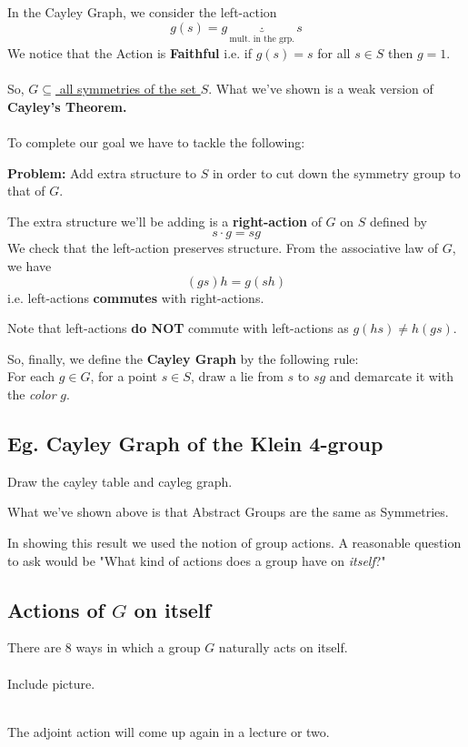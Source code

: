 \documentclass[11pt]{article}
\begin{document}
In the Cayley Graph, we consider the left-action \[ g(s) = g \underbrace{\cdot}_{\text{mult. in the grp.}} s  \] We notice that the Action is \textbf{Faithful} i.e. if $g(s) = s$ for all $s \in S$ then $g = 1$.
\\
\\
So, \underline{$G \subseteq $ all symmetries of the set $S$}. What we've shown is a weak version of \textbf{Cayley's Theorem.}
\\
\\
To complete our goal we have to tackle the following:
\begin{dottedbox}
  \textbf{Problem:} Add extra structure to $S$ in order to cut down the symmetry group to that of $G$.
\end{dottedbox} The extra structure we'll be adding is a \textbf{right-action} of $G$ on $S$ defined by \[ s \cdot g = sg \]
We check that the left-action preserves structure. From the associative law of $G$, we have
\[ (gs)h = g(sh)  \] i.e. left-actions \textbf{commutes} with right-actions.

\begin{redbox}
  Note that left-actions \textbf{do NOT} commute with left-actions as $g(hs) \neq h(gs)$.
\end{redbox} So, finally, we define the \textbf{Cayley Graph} by the following rule:
\\
For each $g \in G$, for a point $s \in S$, draw a lie from $s$ to $sg$ and demarcate it with the \textit{color} $g$.

\subsection*{Eg. Cayley Graph of the Klein 4-group}
Draw the cayley table and cayleg graph. 
\\
\begin{bluebox}
  What we've shown above is that Abstract Groups are the same as Symmetries.
\end{bluebox} In showing this result we used the notion of group actions. A reasonable question to ask would be "What kind of actions does a group have on \textit{itself}?"

\subsection{Actions of $G$ on itself}
There are 8 ways in which a group $G$ naturally acts on itself. 
\\
\\
Include picture.
\\
\\
\begin{remark}
  {The adjoint action will come up again in a lecture or two.}
\end{remark}
\end{document}
